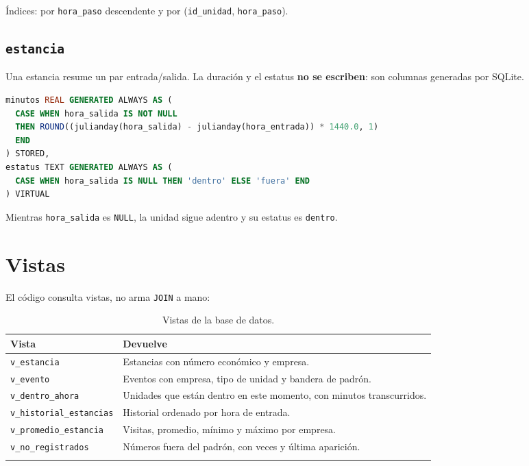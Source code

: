 Índices: por \texttt{hora\_paso} descendente y por
(\texttt{id\_unidad}, \texttt{hora\_paso}).

\subsection{\texttt{estancia}}

Una estancia resume un par entrada/salida. La duración y el estatus
\textbf{no se escriben}: son columnas generadas por SQLite.

\begin{lstlisting}[language=SQL, caption={Columnas generadas de \texttt{estancia}},
                   label={lst:estancia}]
minutos REAL GENERATED ALWAYS AS (
  CASE WHEN hora_salida IS NOT NULL
  THEN ROUND((julianday(hora_salida) - julianday(hora_entrada)) * 1440.0, 1)
  END
) STORED,
estatus TEXT GENERATED ALWAYS AS (
  CASE WHEN hora_salida IS NULL THEN 'dentro' ELSE 'fuera' END
) VIRTUAL
\end{lstlisting}

Mientras \texttt{hora\_salida} es \texttt{NULL}, la unidad sigue adentro y su
estatus es \texttt{dentro}.

\section{Vistas}

El código consulta vistas, no arma \texttt{JOIN} a mano:

\begin{longtable}{@{}L{4.6cm}L{9.6cm}@{}}
  \toprule
  \textbf{Vista} & \textbf{Devuelve} \\
  \midrule
  \endhead
  \texttt{v\_estancia} & Estancias con número económico y empresa. \\
  \texttt{v\_evento} & Eventos con empresa, tipo de unidad y bandera de
    padrón. \\
  \texttt{v\_dentro\_ahora} & Unidades que están dentro en este momento, con
    minutos transcurridos. \\
  \texttt{v\_historial\_estancias} & Historial ordenado por hora de entrada. \\
  \texttt{v\_promedio\_estancia} & Visitas, promedio, mínimo y máximo por
    empresa. \\
  \texttt{v\_no\_registrados} & Números fuera del padrón, con veces y última
    aparición. \\
  \bottomrule
  \caption{Vistas de la base de datos.}
  \label{tab:vistas}
\end{longtable}

